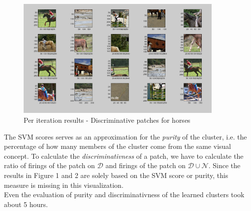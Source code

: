 \begin{figure}[h!]
\centering
\includegraphics[width=0.9\textwidth]{figures/horses.png}
\caption{Per iteration results - Discriminative patches for horses}
\end{figure}

The SVM scores serves as an approximation for the \textit{purity} of the cluster, i.e. the percentage of
how many members of the cluster come from the same visual concept. To calculate the \textit{discriminativness}
of a patch, we have to calculate the ratio of firings of the patch on $\mathcal{D}$ and firings of the patch on $\mathcal{D} \cup \mathcal{N}$.
Since the results in Figure 1 and 2 are solely based on the SVM score or purity, this measure is missing in this visualization.\\
Even the evaluation of purity and discriminativness of the learned clusters took about 5 hours.